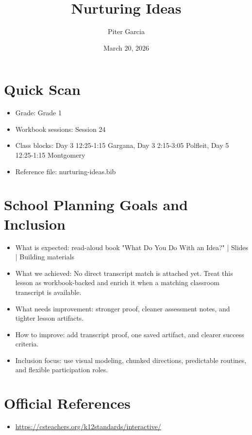 \documentclass[11pt]{article}
\title{Nurturing Ideas}
\author{Piter Garcia}
\date{March 20, 2026}
\begin{document}
\maketitle
\section*{Quick Scan}
\begin{itemize}[leftmargin=*]
\item Grade: Grade 1
\item Workbook sessions: Session 24
\item Class blocks: Day 3 12:25-1:15 Gargana, Day 3 2:15-3:05 Polfleit, Day 5 12:25-1:15 Montgomery
\item Reference file: nurturing-ideas.bib
\end{itemize}
\section*{School Planning Goals and Inclusion}
\begin{itemize}[leftmargin=*]
\item What is expected: read-aloud book "What Do You Do With an Idea?" | Slides | Building materials
\item What we achieved: No direct transcript match is attached yet. Treat this lesson as workbook-backed and enrich it when a matching classroom transcript is available.
\item What needs improvement: stronger proof, cleaner assessment notes, and tighter lesson artifacts.
\item How to improve: add transcript proof, one saved artifact, and clearer success criteria.
\item Inclusion focus: use visual modeling, chunked directions, predictable routines, and flexible participation roles.
\end{itemize}
\section*{Official References}
\begin{itemize}[leftmargin=*]
\item \url{https://csteachers.org/k12standards/interactive/}

\end{itemize}
\end{document}

